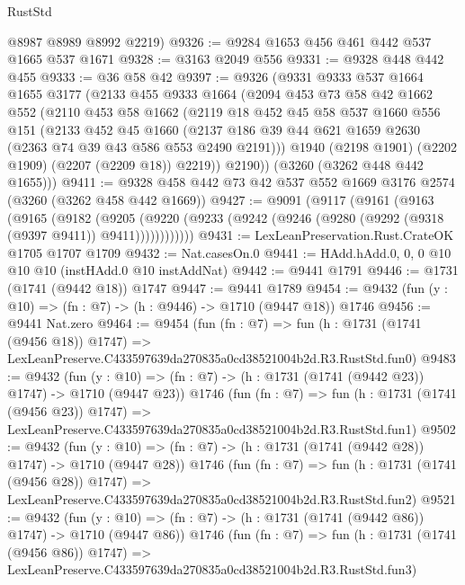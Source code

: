 \begin{lexlean}{RustStd}
\begin{coremodule}
      @8987
      @8989
      @8992
      @2219)
@9326 := @9284 @1653 @456 @461 @442 @537 @1665 @537 @1671
@9328 := @3163 @2049 @556
@9331 := @9328 @448 @442 @455
@9333 := @36 @58 @42
@9397 := @9326
    (@9331
      @9333
      @537
      @1664
      @1655
      @3177
      (@2133
        @455
        @9333
        @1664
        (@2094
          @453
          @73
          @58
          @42
          @1662
          @552
          (@2110
            @453
            @58
            @1662
            (@2119
              @18
              @452
              @45
              @58
              @537
              @1660
              @556
              @151
              (@2133
                @452
                @45
                @1660
                (@2137 @186 @39 @44 @621 @1659 @2630 (@2363 @74 @39 @43 @586 @553 @2490 @2191)))
              @1940
              (@2198 @1901)
              (@2202 @1909)
              (@2207 (@2209 @18))
              @2219))
          @2190))
      (@3260 (@3262 @448 @442 @1655)))
@9411 := @9328 @458 @442 @73 @42 @537 @552 @1669 @3176 @2574 (@3260 (@3262 @458 @442 @1669))
@9427 := @9091
    (@9117
      (@9161
        (@9163
          (@9165
            (@9182
              (@9205
                (@9220 (@9233 (@9242 (@9246 (@9280 (@9292 (@9318 (@9397 @9411)) @9411))))))))))))
@9431 := LexLeanPreservation.Rust.CrateOK @1705 @1707 @1709
@9432 := Nat.casesOn.{0}
@9441 := HAdd.hAdd.{0, 0, 0} @10 @10 @10 (instHAdd.{0} @10 instAddNat)
@9442 := @9441 @1791
@9446 := @1731 (@1741 (@9442 @18)) @1747
@9447 := @9441 @1789
@9454 := @9432 (fun (y : @10) => (fn : @7) -> (h : @9446) -> @1710 (@9447 @18)) @1746
@9456 := @9441 Nat.zero
@9464 := @9454
    (fun (fn : @7) =>
    fun (h : @1731 (@1741 (@9456 @18)) @1747) =>
    LexLeanPreserve.C433597639da270835a0cd38521004b2d.R3.RustStd.fun0)
@9483 := @9432
    (fun (y : @10) => (fn : @7) -> (h : @1731 (@1741 (@9442 @23)) @1747) -> @1710 (@9447 @23))
    @1746
    (fun (fn : @7) =>
    fun (h : @1731 (@1741 (@9456 @23)) @1747) =>
    LexLeanPreserve.C433597639da270835a0cd38521004b2d.R3.RustStd.fun1)
@9502 := @9432
    (fun (y : @10) => (fn : @7) -> (h : @1731 (@1741 (@9442 @28)) @1747) -> @1710 (@9447 @28))
    @1746
    (fun (fn : @7) =>
    fun (h : @1731 (@1741 (@9456 @28)) @1747) =>
    LexLeanPreserve.C433597639da270835a0cd38521004b2d.R3.RustStd.fun2)
@9521 := @9432
    (fun (y : @10) => (fn : @7) -> (h : @1731 (@1741 (@9442 @86)) @1747) -> @1710 (@9447 @86))
    @1746
    (fun (fn : @7) =>
    fun (h : @1731 (@1741 (@9456 @86)) @1747) =>
    LexLeanPreserve.C433597639da270835a0cd38521004b2d.R3.RustStd.fun3)

\end{coremodule}
\end{lexlean}
